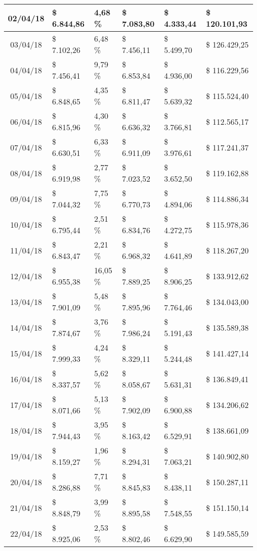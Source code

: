 \begin{small}
\begin{longtable}{|c|l|l|l|l|l|}
02/04/18 & \$ 6.844,86 & 4,68 \% & \$ 7.083,80 & \$ 4.333,44 & \$ 120.101,93 \\ \hline
03/04/18 & \$ 7.102,26 & 6,48 \% & \$ 7.456,11 & \$ 5.499,70 & \$ 126.429,25 \\ \hline
04/04/18 & \$ 7.456,41 & 9,79 \% & \$ 6.853,84 & \$ 4.936,00 & \$ 116.229,56 \\ \hline
05/04/18 & \$ 6.848,65 & 4,35 \% & \$ 6.811,47 & \$ 5.639,32 & \$ 115.524,40 \\ \hline
06/04/18 & \$ 6.815,96 & 4,30 \% & \$ 6.636,32 & \$ 3.766,81 & \$ 112.565,17 \\ \hline
07/04/18 & \$ 6.630,51 & 6,33 \% & \$ 6.911,09 & \$ 3.976,61 & \$ 117.241,37 \\ \hline
08/04/18 & \$ 6.919,98 & 2,77 \% & \$ 7.023,52 & \$ 3.652,50 & \$ 119.162,88 \\ \hline
09/04/18 & \$ 7.044,32 & 7,75 \% & \$ 6.770,73 & \$ 4.894,06 & \$ 114.886,34 \\ \hline
10/04/18 & \$ 6.795,44 & 2,51 \% & \$ 6.834,76 & \$ 4.272,75 & \$ 115.978,36 \\ \hline
11/04/18 & \$ 6.843,47 & 2,21 \% & \$ 6.968,32 & \$ 4.641,89 & \$ 118.267,20 \\ \hline
12/04/18 & \$ 6.955,38 & 16,05 \% & \$ 7.889,25 & \$ 8.906,25 & \$ 133.912,62 \\ \hline
13/04/18 & \$ 7.901,09 & 5,48 \% & \$ 7.895,96 & \$ 7.764,46 & \$ 134.043,00 \\ \hline
14/04/18 & \$ 7.874,67 & 3,76 \% & \$ 7.986,24 & \$ 5.191,43 & \$ 135.589,38 \\ \hline
15/04/18 & \$ 7.999,33 & 4,24 \% & \$ 8.329,11 & \$ 5.244,48 & \$ 141.427,14 \\ \hline
16/04/18 & \$ 8.337,57 & 5,62 \% & \$ 8.058,67 & \$ 5.631,31 & \$ 136.849,41 \\ \hline
17/04/18 & \$ 8.071,66 & 5,13 \% & \$ 7.902,09 & \$ 6.900,88 & \$ 134.206,62 \\ \hline
18/04/18 & \$ 7.944,43 & 3,95 \% & \$ 8.163,42 & \$ 6.529,91 & \$ 138.661,09 \\ \hline
19/04/18 & \$ 8.159,27 & 1,96 \% & \$ 8.294,31 & \$ 7.063,21 & \$ 140.902,80 \\ \hline
20/04/18 & \$ 8.286,88 & 7,71 \% & \$ 8.845,83 & \$ 8.438,11 & \$ 150.287,11 \\ \hline
21/04/18 & \$ 8.848,79 & 3,99 \% & \$ 8.895,58 & \$ 7.548,55 & \$ 151.150,14 \\ \hline
22/04/18 & \$ 8.925,06 & 2,53 \% & \$ 8.802,46 & \$ 6.629,90 & \$ 149.585,59 \\ \hline

\end{longtable}
\end{small}
